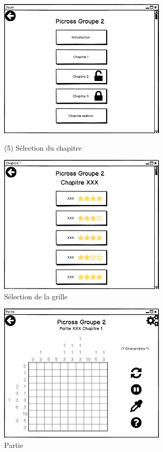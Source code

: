 \documentclass{report}
\begin{document}
	\begin{figure}[H]
    		\begin{minipage}[c]{.46\linewidth}
       			\centering
       			\includegraphics[width=8cm]{Maquettes/Jouer.png}
        			\caption{(5) Sélection du chapitre}
    		\end{minipage}
    		\hfill
   		\begin{minipage}[c]{.46\linewidth}
        			\centering
       			 \includegraphics[width=8cm]{Maquettes/Chapitre_1.png}
        			\caption{Sélection de la grille}
    		\end{minipage}
	\end{figure}
	
	 \begin{figure}[H]
	 	\centering
		\includegraphics[width=8cm]{Maquettes/Partie.png}
		\caption{Partie}
    	\end{figure}
\end{document}
